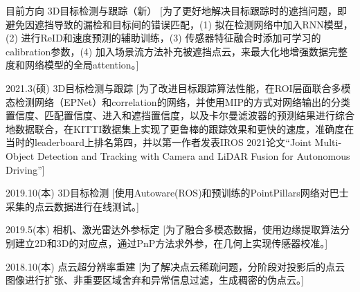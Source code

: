 \documentclass[zh]{resume}
\begin{document}
\begin{experiences}

  \experience%
    {目前方向}%
    {3D目标检测与跟踪（新）}%
    [为了更好地解决目标跟踪时的遮挡问题，即避免因遮挡导致的漏检和目标间的错误匹配，(1) 拟在检测网络中加入RNN模型，(2) 进行ReID和速度预测的辅助训练，(3) 传感器特征融合时添加可学习的calibration参数，(4) 加入场景流方法补充被遮挡点云，来最大化地增强数据完整度和网络模型的全局attention。] 
    
\separator{0.5ex}
  \experience%
    {2021.3(硕)}%
    {3D目标检测与跟踪}%
    [为了改进目标跟踪算法性能，在ROI层面联合多模态检测网络（EPNet）和correlation的网络，并使用MIP的方式对网络输出的分类置信度、匹配置信度、进入和遮挡置信度，以及卡尔曼滤波器的预测结果进行综合地数据联合，在KITTI数据集上实现了更鲁棒的跟踪效果和更快的速度，准确度在当时的leaderboard上排名第四，并以第一作者发表IROS 2021论文``Joint Multi-Object Detection and Tracking with Camera and LiDAR Fusion for Autonomous Driving'']

\separator{0.5ex}
  \experience%
    {2019.10(本)}%
    {3D目标检测}%
    [使用Autoware(ROS)和预训练的PointPillars网络对巴士采集的点云数据进行在线测试。] 

\separator{0.5ex}
  \experience%
    {2019.5(本)}%
    {相机、激光雷达外参标定}%
    [为了融合多模态数据，使用边缘提取算法分别建立2D和3D的对应点，通过PnP方法求外参，在几何上实现传感器校准。]

\separator{0.5ex}
  \experience%
    {2018.10(本)}%
    {点云超分辨率重建}%
    [为了解决点云稀疏问题，分阶段对投影后的点云图像进行扩张、非重要区域舍弃和异常信息过滤，生成稠密的伪点云。]   
\end{experiences}

\begin{competences}[12em]
\end{competences}
\end{document}

